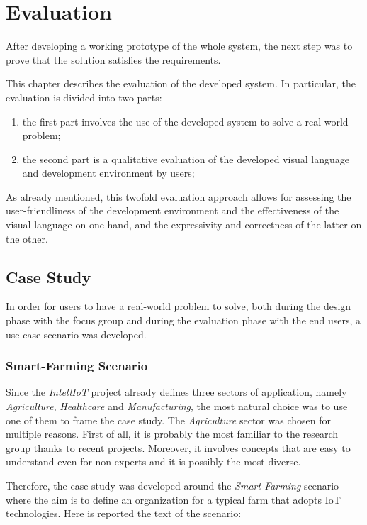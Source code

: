 \chapter{Evaluation}\label{chap:evaluation}
After developing a working prototype of the whole system, the next step was to prove that the solution satisfies the requirements.

This chapter describes the evaluation of the developed system.
In particular, the evaluation is divided into two parts:
\begin{enumerate}
    \item the first part involves the use of the developed system to solve a real-world problem;
    \item the second part is a qualitative evaluation of the developed visual language and development environment by users;
\end{enumerate}
As already mentioned, this twofold evaluation approach allows for assessing the user-friendliness of the development environment and the effectiveness of the visual language on one hand, and the expressivity and correctness of the latter on the other.

\section{Case Study}
In order for users to have a real-world problem to solve, both during the design phase with the focus group and during the evaluation phase with the end users, a use-case scenario was developed.

\subsection{Smart-Farming Scenario}

Since the \textit{IntellIoT} project already defines three sectors of application, namely \textit{Agriculture}, \textit{Healthcare} and \textit{Manufacturing}, the most natural choice was to use one of them to frame the case study.
The \textit{Agriculture} sector was chosen for multiple reasons.
First of all, it is probably the most familiar to the research group thanks to recent projects.
Moreover, it involves concepts that are easy to understand even for non-experts and it is possibly the most diverse.

Therefore, the case study was developed around the \textit{Smart Farming} scenario where the aim is to define an organization for a typical farm that adopts IoT technologies. Here is reported the text of the scenario:

